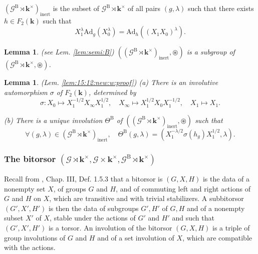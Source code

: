 \documentclass[10pt]{amsart}
\newtheorem{lem}[thm]{Lemma}
\numberwithin{equation}{subsection}
\begin{document}
\begin{defn}
    $(\mathcal G^{\mathrm B}\rtimes\mathbf k^\times)_{\mathrm{inert}}$ is the subset of 
    $\mathcal G^{\mathrm B}\rtimes\mathbf k^\times$
    of all pairs $(g,\lambda)$ such that there exists 
    $h\in F_2(\mathbf k)$ such that 
\begin{equation}\label{def:dual:g:h}
    X_1^\lambda\mathrm{Ad}_{g}(X_0^\lambda)=\mathrm{Ad}_{h}((X_1X_0)^\lambda). 
\end{equation} 
\end{defn}

\begin{lem}\label{lem:semi:B:wo:proof} (see Lem. \ref{lem:semi:B})
$((\mathcal G^{\mathrm B}\rtimes\mathbf k^\times)_{\mathrm{inert}},\circledast)$
    is a subgroup of $(\mathcal G^{\mathrm B}\rtimes\mathbf k^\times,\circledast)$.  
\end{lem}

\begin{lem}\label{lem:15:12:new} (Lem. \ref{lem:15:12:new:w:proof})
(a) There is an involutive automorphism $\sigma$ of $F_2(\mathbf k)$, determined by 
$$
\sigma : X_0\mapsto X_1^{-1/2}X_\infty X_1^{1/2},\quad X_\infty\mapsto X_1^{1/2}X_0X_1^{-1/2},
\quad X_1\mapsto X_1.  
$$

(b) There is a unique involution $\Theta^{\mathrm B}$ of 
$((\mathcal G^{\mathrm B}\rtimes\mathbf k^\times)_{\mathrm{inert}},\circledast)$
such that 
$$
\forall (g,\lambda)\in (\mathcal G^{\mathrm B}\rtimes\mathbf k^\times)_{\mathrm{inert}}, \quad 
\Theta^{\mathrm B}(g,\lambda)=(X_1^{-\lambda/2} \sigma(h_g)X_1^{1/2},\lambda). 
$$
\end{lem}

\subsubsection{ The bitorsor $(\mathcal G \rtimes \mathbf k^\times,
\mathcal G \times\mathbf k^\times,
\mathcal G^{\mathrm B} \rtimes \mathbf k^\times)$}


Recall from \cite{Gi}, 
Chap. III, Def. 1.5.3 that a bitorsor is $(G,X,H)$ is the data of a nonempty set $X$, of 
groups $G$ and $H$, and of commuting left and right actions of $G$ and $H$ on $X$, which are
transitive and with trivial stabilizers. A subbitorsor $(G',X',H')$ is then the data of
subgroups $G',H'$ of $G,H$ and of a nonempty subset $X'$ of $X$, stable under the actions of $G'$ and
$H'$ and such that $(G',X',H')$ is a torsor. An involution of the bitorsor 
$(G,X,H)$ is a triple of group involutions of $G$ and $H$ and of a set involution of 
$X$, which are compatible with the actions. 
\end{document}
